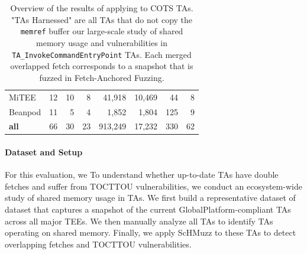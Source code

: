 \documentclass[conference]{IEEEtran} %
\newcommand{\sysname}{ScHMuzz\xspace}
\newcommand{\stagetwo}{Fetch-Anchored Fuzzing\xspace} %
\newcommand{\mitee}{MiTEE\xspace}
\newcommand{\beanpod}{Beanpod\xspace}
\newcommand{\nummiteeTAs}{12\xspace}
\newcommand{\nummiteeTAsharnessed}{10\xspace}
\newcommand{\numbeanpodTAs}{11\xspace}
\newcommand{\numbeanpodTAsharnessed}{5\xspace}
\newcommand{\numTAs}{66\xspace}
\newcommand{\numTAsharnessed}{30\xspace}
\newcommand{\numTAsdfmitee}{8\xspace}
\newcommand{\numTAsdfbeanpod}{4\xspace}
\newcommand{\numTAsdf}{23\xspace}
\newcommand{\numdfsmitee}{41,918\xspace}
\newcommand{\numdfsbeanpod}{1,852\xspace}
\newcommand{\numdfs}{913,249\xspace}
\newcommand{\numdfsmergemitee}{10,469\xspace}
\newcommand{\numdfsmergebeanpod}{1,804\xspace}
\newcommand{\numdfsmerge}{17,232\xspace}
\newcommand{\numcrashesmitee}{44\xspace}
\newcommand{\numcrashesbeanpod}{125\xspace}
\newcommand{\numcrashes}{330\xspace}
\newcommand{\numcrashesdistillmitee}{8\xspace}
\newcommand{\numcrashesdistillbeanpod}{9\xspace}
\newcommand{\numcrashesdistill}{62\xspace}
\providecommand{\DIFaddtex}[1]{{\protect\color{blue} \sf #1}} %
\providecommand{\DIFdeltex}[1]{{\protect\color{red} \scriptsize #1}} %
\providecommand{\DIFaddbegin}{} %
\providecommand{\DIFaddend}{} %
\providecommand{\DIFdelbegin}{} %
\providecommand{\DIFdelend}{} %
\providecommand{\DIFaddFL}[1]{\DIFadd{#1}} %
\providecommand{\DIFdelFL}[1]{\DIFdel{#1}} %
\providecommand{\DIFaddbeginFL}{} %
\providecommand{\DIFaddendFL}{} %
\providecommand{\DIFdelbeginFL}{} %
\providecommand{\DIFdelendFL}{} %
\providecommand{\DIFadd}[1]{\texorpdfstring{\DIFaddtex{#1}}{#1}} %
\providecommand{\DIFdel}[1]{\texorpdfstring{\DIFdeltex{#1}}{}} %
\begin{document}
\begin{table}[t]
\begin{tabular}{lrrrrrrr}
        \mitee      & \nummiteeTAs     & \nummiteeTAsharnessed     & \numTAsdfmitee    & \numdfsmitee      & \numdfsmergemitee     & \numcrashesmitee & \numcrashesdistillmitee\\
        \beanpod    & \numbeanpodTAs   & \numbeanpodTAsharnessed   & \numTAsdfbeanpod  & \numdfsbeanpod    & \numdfsmergebeanpod   & \numcrashesbeanpod & \numcrashesdistillbeanpod\\
        \midrule
        \textbf{all}& \numTAs          & \numTAsharnessed          & \numTAsdf         & \numdfs           & \numdfsmerge          & \numcrashes & \numcrashesdistill\\
        \bottomrule
    \end{tabular}
    \caption{
        Overview of the results of \DIFdelbeginFL \DIFdelFL{applying }%
\DIFdelFL{to COTS TAs. "TAs Harnessed" are all TAs that do not copy the 
        }\texttt{\DIFdelFL{memref}} %
\DIFdelFL{buffer }\DIFdelendFL \DIFaddbeginFL \DIFaddFL{our large-scale study of shared 
        memory usage and vulnerabilities }\DIFaddendFL in \DIFdelbeginFL \texttt{\DIFdelFL{TA\_InvokeCommandEntryPoint}}%
\DIFdelendFL \DIFaddbeginFL \DIFaddFL{TAs}\DIFaddendFL . 
        Each merged overlapped fetch corresponds to a snapshot that is fuzzed in 
        \stagetwo.
    }
    \label{tab:dataset}
\end{table}
\DIFdelbegin \paragraph{\DIFdel{Dataset and Setup}}
\addtocounter{paragraph}{-1}%
\DIFdelend 

%                                                                                      

\DIFdelbegin \DIFdel{For this evaluation, we }\DIFdelend \DIFaddbegin \DIFadd{To understand whether up-to-date TAs have double fetches and suffer from TOCTTOU 
vulnerabilities, we conduct an ecosystem-wide study of shared memory usage in TAs.
We }\DIFaddend first build a \DIFdelbegin \DIFdel{representative dataset of }\DIFdelend \DIFaddbegin \DIFadd{dataset that captures a snapshot of the current 
GlobalPlatform-compliant TAs across all major TEEs. We then manually analyze all 
TAs to identify TAs operating on shared memory. 
Finally, we apply }\sysname \DIFadd{to these TAs to detect overlapping fetches and TOCTTOU vulnerabilities.
}
\end{document}
